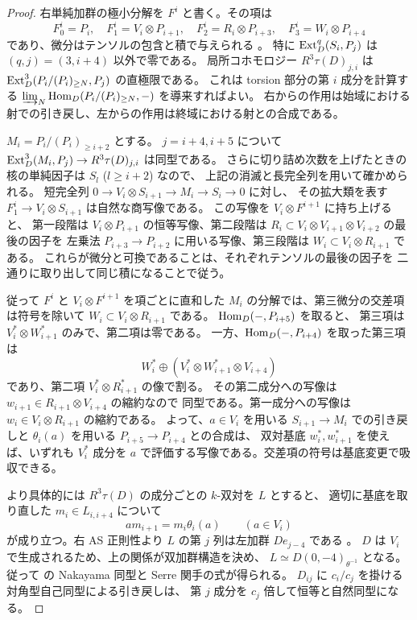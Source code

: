 \begin{proof}
右単純加群の極小分解を $F^i$ と書く。その項は
\[
 F^i_0=P_i,\quad F^i_1=V_i\otimes P_{i+1},\quad
 F^i_2=R_i\otimes P_{i+3},\quad F^i_3=W_i\otimes P_{i+4}
\]
であり、微分はテンソルの包含と積で与えられる
\cite[arXiv v3, Theorem 5.5.7]{VdB2011}。
特に $\operatorname{Ext}_D^q(S_i,P_j)$ は $(q,j)=(3,i+4)$ 以外で零である。
局所コホモロジー $R^3\tau(D)_{j,i}$ は
$\operatorname{Ext}^3_D(P_i/(P_i)_{\ge N},P_j)$ の直極限である。
これは torsion 部分の第 $i$ 成分を計算する
$\varinjlim_N\operatorname{Hom}_D(P_i/(P_i)_{\ge N},-)$ を導来すればよい。
右からの作用は始域における射での引き戻し、左からの作用は終域における射との合成である。

$M_i=P_i/(P_i)_{\ge i+2}$ とする。
$j=i+4,i+5$ について $\operatorname{Ext}^3_D(M_i,P_j)\to R^3\tau(D)_{j,i}$ は同型である。
さらに切り詰め次数を上げたときの核の単純因子は $S_l$ ($l\ge i+2$) なので、
上記の消滅と長完全列を用いて確かめられる。
短完全列 $0\to V_i\otimes S_{i+1}\to M_i\to S_i\to0$ に対し、
その拡大類を表す $F^i_1\to V_i\otimes S_{i+1}$ は自然な商写像である。
この写像を $V_i\otimes F^{i+1}$ に持ち上げると、
第一段階は $V_i\otimes P_{i+1}$ の恒等写像、第二段階は
$R_i\subset V_i\otimes V_{i+1}\otimes V_{i+2}$ の最後の因子を
左乗法 $P_{i+3}\to P_{i+2}$ に用いる写像、第三段階は
$W_i\subset V_i\otimes R_{i+1}$ である。
これらが微分と可換であることは、それぞれテンソルの最後の因子を
二通りに取り出して同じ積になることで従う。

従って $F^i$ と $V_i\otimes F^{i+1}$ を項ごとに直和した
$M_i$ の分解では、第三微分の交差項は符号を除いて
$W_i\subset V_i\otimes R_{i+1}$ である。
$\operatorname{Hom}_D(-,P_{i+5})$ を取ると、
第三項は $V_i^*\otimes W_{i+1}^*$ のみで、第二項は零である。
一方、$\operatorname{Hom}_D(-,P_{i+4})$ を取った第三項は
\[
 W_i^*\oplus(V_i^*\otimes W_{i+1}^*\otimes V_{i+4})
\]
であり、第二項 $V_i^*\otimes R_{i+1}^*$ の像で割る。
その第二成分への写像は $w_{i+1}\in R_{i+1}\otimes V_{i+4}$ の縮約なので
同型である。第一成分への写像は $w_i\in V_i\otimes R_{i+1}$ の縮約である。
よって、$a\in V_i$ を用いる $S_{i+1}\to M_i$ での引き戻しと
$\theta_i(a)$ を用いる $P_{i+5}\to P_{i+4}$ との合成は、
双対基底 $w_i^*,w_{i+1}^*$ を使えば、いずれも
$V_i^*$ 成分を $a$ で評価する写像である。交差項の符号は基底変更で吸収できる。

より具体的には $R^3\tau(D)$ の成分ごとの $k$-双対を $L$ とすると、
適切に基底を取り直した $m_i\in L_{i,i+4}$ について
\[
 a m_{i+1}=m_i\theta_i(a)\qquad(a\in V_i)
\]
が成り立つ。右 AS 正則性より $L$ の第 $j$ 列は左加群 $D e_{j-4}$ である
\cite[arXiv v1, Theorem 4.8 and Remark 4.10]{MN2025}。
$D$ は $V_i$ で生成されるため、上の関係が双加群構造を決め、
$L\simeq D(0,-4)_{\theta^{-1}}$ となる。
従って \cite[arXiv v1, Definition 4.15 and Theorem 6.8]{MN2025} の
Nakayama 同型と Serre 関手の式が得られる。
$D_{ij}$ に $c_i/c_j$ を掛ける対角型自己同型による引き戻しは、
第 $j$ 成分を $c_j$ 倍して恒等と自然同型になる。
\end{proof}

